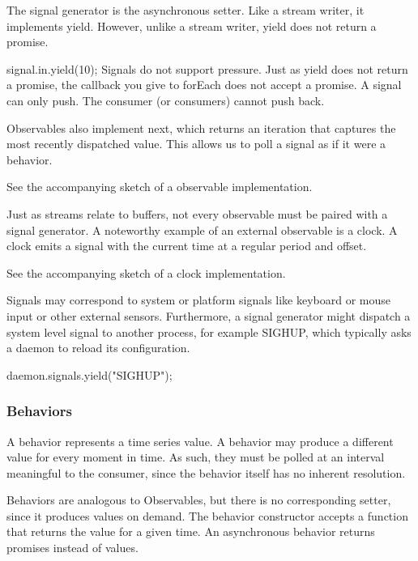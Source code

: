 The signal generator is the asynchronous setter. Like a stream writer, it implements yield. However, unlike a stream writer, yield does not return a promise.

signal.in.yield(10);
Signals do not support pressure. Just as yield does not return a promise, the callback you give to forEach does not accept a promise. A signal can only push. The consumer (or consumers) cannot push back.

Observables also implement next, which returns an iteration that captures the most recently dispatched value. This allows us to poll a signal as if it were a behavior.

See the accompanying sketch of a observable implementation.

Just as streams relate to buffers, not every observable must be paired with a signal generator. A noteworthy example of an external observable is a clock. A clock emits a signal with the current time at a regular period and offset.

See the accompanying sketch of a clock implementation.

Signals may correspond to system or platform signals like keyboard or mouse input or other external sensors. Furthermore, a signal generator might dispatch a system level signal to another process, for example SIGHUP, which typically asks a daemon to reload its configuration.

daemon.signals.yield("SIGHUP");

\subsubsection{Behaviors}

A behavior represents a time series value. A behavior may produce a different value for every moment in time. As such, they must be polled at an interval meaningful to the consumer, since the behavior itself has no inherent resolution.

Behaviors are analogous to Observables, but there is no corresponding setter, since it produces values on demand. The behavior constructor accepts a function that returns the value for a given time. An asynchronous behavior returns promises instead of values.

